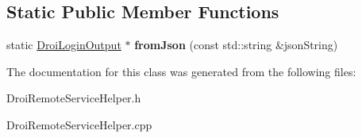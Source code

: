 \subsection*{Static Public Member Functions}
\begin{DoxyCompactItemize}
\item 
\mbox{\label{class_droi_login_output_a8d32d1ff556794544359e9d978faac58}} 
static \hyperlink{class_droi_login_output}{Droi\+Login\+Output} $\ast$ {\bfseries from\+Json} (const std\+::string \&json\+String)
\end{DoxyCompactItemize}


The documentation for this class was generated from the following files\+:\begin{DoxyCompactItemize}
\item 
Droi\+Remote\+Service\+Helper.\+h\item 
Droi\+Remote\+Service\+Helper.\+cpp\end{DoxyCompactItemize}
